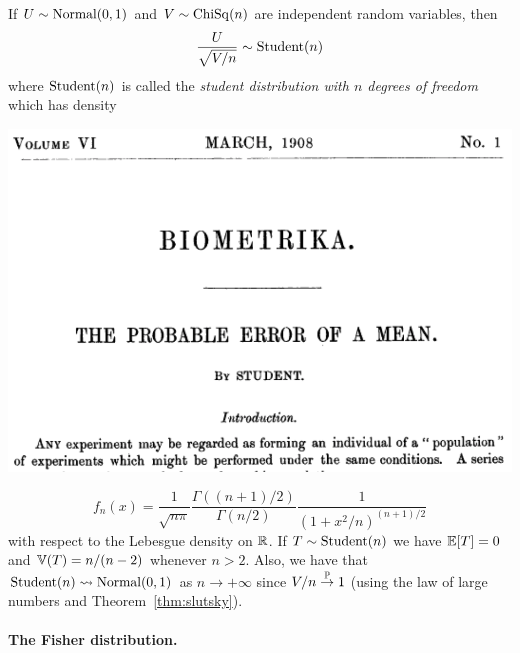 If $U \sim \operatorname{Normal}(0, 1)$ and $V \sim \operatorname{ChiSq}(n)$ are independent random variables, then
\begin{equation}
	\label{eq:student-definition}
	\frac{U}{\sqrt{V / n}} \sim \operatorname{Student}(n)
\end{equation}
where $\operatorname{Student}(n)$ is called the \emph{student distribution with $n$ degrees of freedom}%
which has density%
\begin{marginfigure}
	\includegraphics{images/student.png}
\end{marginfigure}
\begin{equation*}
	f_n(x) = \frac{1}{\sqrt{n \pi}} \frac{\Gamma((n+1) / 2)}{\Gamma(n/2)} \frac{1}{(1 + x^2 / n)^{(n + 1)/2}}
\end{equation*}
with respect to the Lebesgue density on $\mathbb R$.
If $T \sim \operatorname{Student}(n)$ we have $\mathbb E[T] = 0$ and $\mathbb V(T) = n / (n - 2)$ whenever $n > 2$.
Also, we have that $\operatorname{Student}(n) \leadsto \operatorname{Normal}(0, 1)$ as $n \rightarrow +\infty$ since $V / n \overset{\mathbb P}{\rightarrow} 1$ (using the law of large numbers and Theorem~\ref{thm:slutsky}).


\paragraph{The Fisher distribution.}

